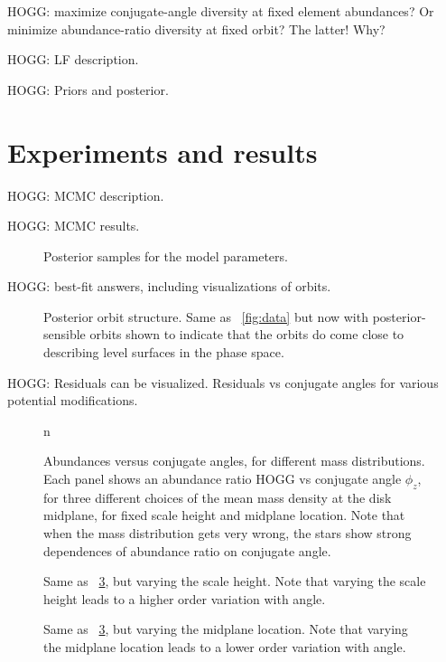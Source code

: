 \documentclass[modern]{aastex62}
\begin{document}
HOGG: maximize conjugate-angle diversity at fixed element abundances?
Or minimize abundance-ratio diversity at fixed orbit? The latter! Why?

HOGG: LF description.

HOGG: Priors and posterior.

\section{Experiments and results}

HOGG: MCMC description.

HOGG: MCMC results.
\begin{figure}
\caption{Posterior samples for the model parameters.\label{fig:samples}}
\end{figure}

HOGG: best-fit answers, including visualizations of orbits.
\begin{figure}
\caption{Posterior orbit structure. Same as \figurename~\ref{fig:data} but now with
posterior-sensible orbits shown to indicate that the orbits do come close to describing
level surfaces in the phase space.\label{fig:orbits}}
\end{figure}

HOGG: Residuals can be visualized. Residuals vs conjugate angles for various potential modifications.

\begin{figure}
n\caption{Abundances versus conjugate angles, for different mass distributions.
Each panel shows an abundance ratio HOGG vs conjugate angle $\phi_z$, for three different
choices of the mean mass density at the disk midplane, for fixed scale height and midplane
location. Note that when the mass distribution gets very wrong, the stars show strong
dependences of abundance ratio on conjugate angle.\label{fig:density}}
\end{figure}

\begin{figure}
\caption{Same as \figurename~\ref{fig:density}, but varying the scale height. Note that
varying the scale height leads to a higher order variation with angle.\label{fig:scaleheight}}
\end{figure}

\begin{figure}
\caption{Same as \figurename~\ref{fig:density}, but varying the midplane location. Note
that varying the midplane location leads to a lower order variation with angle.\label{fig:midplane}}
\end{figure}
\end{document}
